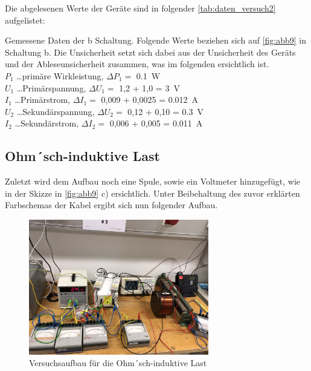 \documentclass[11pt,ngerman]{scrartcl}
\begin{document}
Die abgelesenen Werte der Geräte sind in folgender \autoref{tab:daten_versuch2} aufgelistet:

\begin{table}[H]
	\caption{Gemessene Daten der b Schaltung. Folgende Werte beziehen sich auf \autoref{fig:abb9} in Schaltung b. Die Unsicherheit setzt sich dabei aus der Unsicherheit des Geräts und der Ableseunsicherheit zusammen, was im folgenden ersichtlich ist.\\
		$P_1$ \dots primäre Wirkleistung, $\Delta P_1 =$ \SI{0.1}{W}\\
		$U_1$ \dots  Primärspannung, $\Delta U_1 =$ 1,2 + 1,0 = \SI{3}{V} \\
		$I_1$ \dots Primärstrom, $\Delta I_1 =$ 0,009 + 0,0025 = \SI{0.012}{A} \\
		$U_2$ \dots Sekundärspannung, $\Delta U_2 =$ 0,12 + 0,10 = \SI{0.3}{V}  \\
		$I_2$ \dots Sekundärstrom, $\Delta I_2 =$ 0,006 + 0,005 = \SI{0.011}{A} \\
	}
	\label{tab:daten_versuch2}
	\begin{center}
		
	\end{center}
\end{table}


\subsection{Ohm´sch-induktive Last}

Zuletzt wird dem Aufbau noch eine Spule, sowie ein Voltmeter hinzugefügt, wie
in der Skizze in \autoref{fig:abb9} c) ersichtlich. Unter Beibehaltung des
zuvor erklärten Farbschemas der Kabel ergibt sich nun folgender Aufbau.

\begin{figure}[H]
	\begin{center}
		\includegraphics[width=0.7\textwidth]{spule}
	\end{center}
	\caption{Versuchsaufbau für die Ohm´sch-induktive Last}
	\label{fig:spule}
\end{figure}
\end{document}
